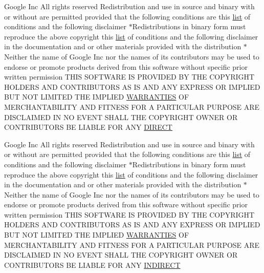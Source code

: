\begin{DoxyCompactItemize}
Google Inc All rights reserved Redistribution and use in source and binary with or without are permitted provided that the following conditions are this \hyperlink{CMakeLists_8txt_a548e427ae9357a6f3536cff3ca23efda}{list} of conditions and the following disclaimer $\ast$Redistributions in binary form must reproduce the above copyright this \hyperlink{CMakeLists_8txt_a548e427ae9357a6f3536cff3ca23efda}{list} of conditions and the following disclaimer in the documentation and or other materials provided with the distribution $\ast$Neither the name of Google Inc nor the names of its contributors may be used to endorse or promote products derived from this software without specific prior written permission T\+H\+IS S\+O\+F\+T\+W\+A\+RE IS P\+R\+O\+V\+I\+D\+ED BY T\+HE C\+O\+P\+Y\+R\+I\+G\+HT H\+O\+L\+D\+E\+RS A\+ND C\+O\+N\+T\+R\+I\+B\+U\+T\+O\+RS AS IS A\+ND A\+NY E\+X\+P\+R\+E\+SS OR I\+M\+P\+L\+I\+ED B\+UT N\+OT L\+I\+M\+I\+T\+ED T\+HE I\+M\+P\+L\+I\+ED \hyperlink{COPYING_8txt_ac62ff2f8b2f565a26b35ecca12f17f4a}{W\+A\+R\+R\+A\+N\+T\+I\+ES} OF M\+E\+R\+C\+H\+A\+N\+T\+A\+B\+I\+L\+I\+TY A\+ND F\+I\+T\+N\+E\+SS F\+OR A P\+A\+R\+T\+I\+C\+U\+L\+AR P\+U\+R\+P\+O\+SE A\+RE D\+I\+S\+C\+L\+A\+I\+M\+ED IN NO E\+V\+E\+NT S\+H\+A\+LL T\+HE C\+O\+P\+Y\+R\+I\+G\+HT O\+W\+N\+ER OR C\+O\+N\+T\+R\+I\+B\+U\+T\+O\+RS BE L\+I\+A\+B\+LE F\+OR A\+NY \hyperlink{COPYING_8txt_ab085cad7c3d475ef9ae1bcc8bba9b189}{D\+I\+R\+E\+CT}
\item 
Google Inc All rights reserved Redistribution and use in source and binary with or without are permitted provided that the following conditions are this \hyperlink{CMakeLists_8txt_a548e427ae9357a6f3536cff3ca23efda}{list} of conditions and the following disclaimer $\ast$Redistributions in binary form must reproduce the above copyright this \hyperlink{CMakeLists_8txt_a548e427ae9357a6f3536cff3ca23efda}{list} of conditions and the following disclaimer in the documentation and or other materials provided with the distribution $\ast$Neither the name of Google Inc nor the names of its contributors may be used to endorse or promote products derived from this software without specific prior written permission T\+H\+IS S\+O\+F\+T\+W\+A\+RE IS P\+R\+O\+V\+I\+D\+ED BY T\+HE C\+O\+P\+Y\+R\+I\+G\+HT H\+O\+L\+D\+E\+RS A\+ND C\+O\+N\+T\+R\+I\+B\+U\+T\+O\+RS AS IS A\+ND A\+NY E\+X\+P\+R\+E\+SS OR I\+M\+P\+L\+I\+ED B\+UT N\+OT L\+I\+M\+I\+T\+ED T\+HE I\+M\+P\+L\+I\+ED \hyperlink{COPYING_8txt_ac62ff2f8b2f565a26b35ecca12f17f4a}{W\+A\+R\+R\+A\+N\+T\+I\+ES} OF M\+E\+R\+C\+H\+A\+N\+T\+A\+B\+I\+L\+I\+TY A\+ND F\+I\+T\+N\+E\+SS F\+OR A P\+A\+R\+T\+I\+C\+U\+L\+AR P\+U\+R\+P\+O\+SE A\+RE D\+I\+S\+C\+L\+A\+I\+M\+ED IN NO E\+V\+E\+NT S\+H\+A\+LL T\+HE C\+O\+P\+Y\+R\+I\+G\+HT O\+W\+N\+ER OR C\+O\+N\+T\+R\+I\+B\+U\+T\+O\+RS BE L\+I\+A\+B\+LE F\+OR A\+NY \hyperlink{COPYING_8txt_aef79968d412fcedee72a1effea35b4b7}{I\+N\+D\+I\+R\+E\+CT}

\end{DoxyCompactItemize}
